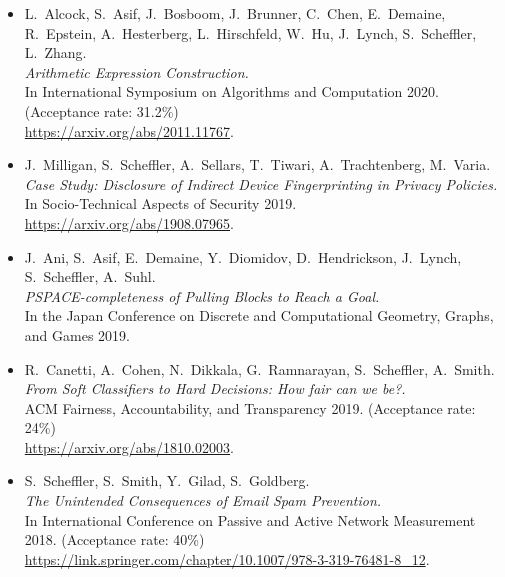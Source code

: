 \documentclass{res}
\begin{document}
\begin{resume}
\begin{itemize}
\item[\AEC] L.~Alcock, S.~Asif, J.~Bosboom, J.~Brunner, C.~Chen, E.~Demaine, R.~Epstein,
A.~Hesterberg, L.~Hirschfeld, W.~Hu, J.~Lynch, S.~Scheffler, L.~Zhang. \\
\emph{Arithmetic Expression Construction.} \\
In International Symposium on Algorithms and Computation 2020. (Acceptance rate: 31.2\%) \\
\url{https://arxiv.org/abs/2011.11767}.

\item[\devicefingerprinting] J.~Milligan, S.~Scheffler, A.~Sellars, T.~Tiwari, A.~Trachtenberg, M.~Varia.  \\
\emph{Case Study: Disclosure of Indirect Device Fingerprinting in Privacy Policies.} \\
In Socio-Technical Aspects of Security 2019. \\
\url{https://arxiv.org/abs/1908.07965}.

\item[\pullingblocks] J.~Ani, S.~Asif, E.~Demaine, Y.~Diomidov, D.~Hendrickson, J.~Lynch, S.~Scheffler, A.~Suhl. \\
\emph{PSPACE-completeness of Pulling Blocks to Reach a Goal.}  \\
In the Japan Conference on Discrete and Computational Geometry, Graphs, and Games 2019.

\item[\fairsibility] R.~Canetti, A.~Cohen, N.~Dikkala, G.~Ramnarayan, S.~Scheffler, A.~Smith. \\
\emph{From Soft Classifiers to Hard Decisions: How fair can we be?.} \\
ACM Fairness, Accountability, and Transparency 2019. (Acceptance rate: 24\%) \\
\url{https://arxiv.org/abs/1810.02003}.

\item[\emailspam] S.~Scheffler, S.~Smith, Y.~Gilad, S.~Goldberg. \\
\emph{The Unintended Consequences of Email Spam Prevention.} \\
In International Conference on Passive and Active Network Measurement 2018. (Acceptance rate: 40\%) \\
\url{https://link.springer.com/chapter/10.1007/978-3-319-76481-8\_12}.
\end{itemize}

\vspace{0.25in}


\end{resume}
\end{document}
